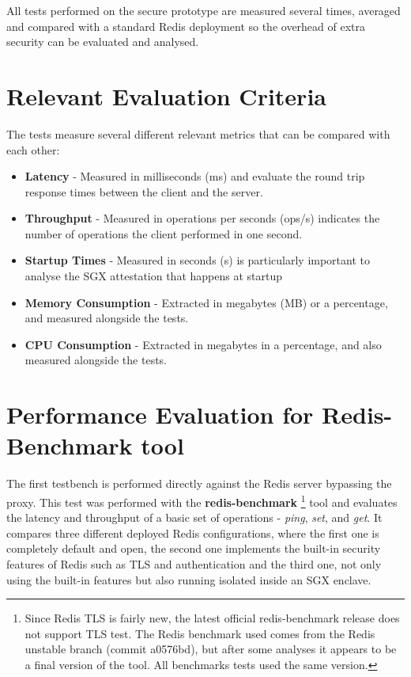 All tests performed on the secure prototype are measured several times, averaged and compared with a standard Redis deployment so the overhead of extra security can be evaluated and analysed. 

\section{Relevant Evaluation Criteria}
\label{sec:revelant_evaluation_criteria}

The tests measure several different relevant metrics that can be compared with each other: 

\begin{itemize}
  \item \textbf{Latency} - Measured in milliseconds (ms) and evaluate the round trip response times between the client and the server.
  \item \textbf{Throughput} - Measured in operations per seconds (ops/s) indicates the number of operations the client performed in one second.
  \item \textbf{Startup Times} - Measured in seconds (s) is particularly important to analyse the \gls{SGX} attestation that happens at startup
  \item \textbf{Memory Consumption} - Extracted in megabytes (MB) or a percentage, and measured alongside the tests.
  \item \textbf{\gls{CPU} Consumption} - Extracted in megabytes in a percentage, and also measured alongside the tests.
\end{itemize}

\section{Performance Evaluation for Redis-Benchmark tool}
\label{sec:performance_evaluation_redis_benchmark_tool}

The first testbench is performed directly against the Redis server bypassing the proxy. This test was performed with the \textbf{redis-benchmark} \footnote{Since Redis TLS is fairly new, the latest official redis-benchmark release does not support TLS test. The Redis benchmark used comes from the Redis unstable branch (commit a0576bd), but after some analyses it appears to be a final version of the tool. All benchmarks tests used the same version.} tool and evaluates the latency and throughput of a basic set of operations - \textit{ping}, \textit{set}, and \textit{get}. It compares three different deployed Redis configurations, where the first one is completely default and open, the second one implements the built-in security features of Redis such as \gls{TLS} and authentication and the third one, not only using the built-in features but also running isolated inside an \gls{SGX} enclave.

